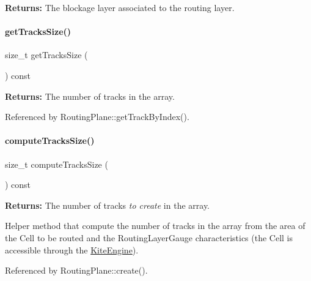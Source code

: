 {\bfseries Returns\+:} The blockage layer associated to the routing layer. \mbox{\label{classKite_1_1RoutingPlane_aa44eb6d4806e49d36bf273cd9d979197}} 
\paragraph{\texorpdfstring{get\+Tracks\+Size()}{getTracksSize()}}
{\footnotesize\ttfamily size\+\_\+t get\+Tracks\+Size (\begin{DoxyParamCaption}{ }\end{DoxyParamCaption}) const\hspace{0.3cm}{\ttfamily [inline]}}

{\bfseries Returns\+:} The number of tracks in the array. 

Referenced by Routing\+Plane\+::get\+Track\+By\+Index().

\mbox{\label{classKite_1_1RoutingPlane_a4b4c6bb50297d585962d84b2a165e139}} 
\paragraph{\texorpdfstring{compute\+Tracks\+Size()}{computeTracksSize()}}
{\footnotesize\ttfamily size\+\_\+t compute\+Tracks\+Size (\begin{DoxyParamCaption}{ }\end{DoxyParamCaption}) const\hspace{0.3cm}{\ttfamily [inline]}}

{\bfseries Returns\+:} The number of tracks {\itshape to create} in the array.

Helper method that compute the number of tracks in the array from the area of the Cell to be routed and the Routing\+Layer\+Gauge characteristics (the Cell is accessible through the \hyperlink{classKite_1_1KiteEngine}{Kite\+Engine}). 

Referenced by Routing\+Plane\+::create().

\mbox{\label{classKite_1_1RoutingPlane_ae2ea9830bfcd3d7f36af63bcad3eed6e}} 
